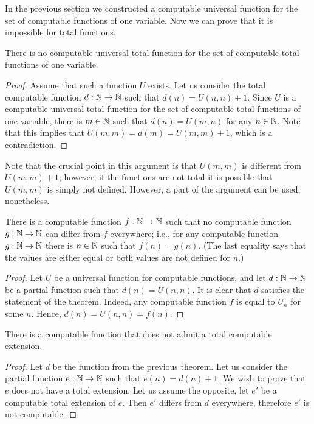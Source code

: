 In the previous section we constructed a computable universal function for
the set of computable functions of one variable. Now we can prove that
it is impossible for total functions.
\begin{theorem}
    There is no computable universal total function for
    the set of computable total functions of one variable.
\end{theorem}
\begin{proof}
  Assume that such a function $U$ exists. Let us consider the total computable
  function $d : {\mathbb{N}} \to {\mathbb{N}}$ such that $d(n) = U(n, n) + 1$. Since $U$ is a
  computable universal total function for the set of computable total functions
  of one variable, there is $m \in {\mathbb{N}}$ such that $d(n) = U(m, n)$ for any
  $n \in {\mathbb{N}}$. Note that this implies that $U(m, m) = d(m) = U(m, m) + 1$,
  which is a contradiction.
\end{proof}
Note that the crucial point in this argument is that $U(m, m)$ is different
from $U(m, m) + 1$; however, if the functions are not total it is possible
that $U(m, m)$ is simply not defined. However, a part of the argument can be
used, nonetheless.
\begin{theorem}
    There is a computable function $f : {\mathbb{N}} \to {\mathbb{N}}$ such that
    no computable function $g : {\mathbb{N}} \to {\mathbb{N}}$ can differ from $f$
    everywhere; i.e., for any computable function $g : {\mathbb{N}} \to {\mathbb{N}}$
    there is $n \in {\mathbb{N}}$ such that $f(n) = g(n)$.
    (The last equality says that the values are either equal or
    both values are not defined for $n$.)
\end{theorem}
\begin{proof}
  Let $U$ be a universal function for computable functions, and
  let $d : {\mathbb{N}} \to {\mathbb{N}}$ be a partial function such that $d(n) = U(n, n)$.
  It is clear that $d$ satisfies the statement of the theorem. Indeed,
  any computable function $f$ is equal to $U_n$  for some $n$. Hence,
  $d(n) = U(n, n) = f(n)$.
\end{proof}

\begin{theorem}
    There is a computable function that does not admit a total computable
    extension.
\end{theorem}
\begin{proof}
  Let $d$ be the function from the previous theorem. Let us consider the
  partial function $e : {\mathbb{N}} \to {\mathbb{N}}$ such that $e(n) = d(n) + 1$.
  We wish to prove that $e$ does not have a total extension. Let us assume
  the opposite, let $e'$ be a computable total extension of $e$. Then $e'$
  differs from $d$ everywhere, therefore $e'$ is not computable.
\end{proof}


